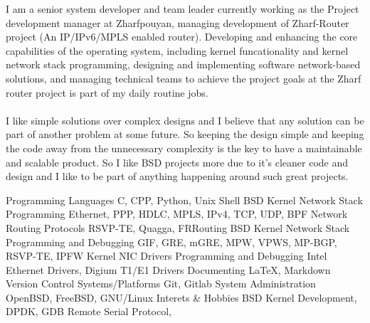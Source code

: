 \documentclass[12pt]{developercv}
\begin{document}
\begin{minipage}[t]{1\textwidth}
I am a senior system developer and team leader currently working
as the Project development manager at Zharfpouyan, managing development
of Zharf-Router project (An IP/IPv6/MPLS enabled router).
Developing and enhancing the core capabilities of the operating system,
including kernel funcationality and kernel network stack programming,
designing and implementing software network-based solutions, and managing
technical teams to achieve the project goals at the Zharf router project is
part of my daily routine jobs.
\\
\\
I like simple solutions over complex designs and I believe that any solution
can be part of another problem at some future. So keeping the design simple and
keeping the code away from the unnecessary complexity is the key to have a
maintainable and scalable product. So I like BSD projects more due to it's cleaner
code and design and I like to be part of anything happening around such great projects.

\end{minipage}
\hfill %
%

\begin{entrylist}
	\entry
		{}
		{Programming Languages}
		{}
		{C, CPP, Python, Unix Shell}
	\entry
		{}
		{BSD Kernel Network Stack Programming}
		{}
		{Ethernet, PPP, HDLC, MPLS, IPv4, TCP, UDP, BPF}
	\entry
		{}
		{Network Routing Protocols}
		{}
		{RSVP-TE, Quagga, FRRouting}
	\entry
		{}
		{BSD Kernel Network Stack Programming and Debugging}
		{}
		{GIF, GRE, mGRE, MPW, VPWS, MP-BGP, RSVP-TE, IPFW}
	\entry
		{}
		{Kernel NIC Drivers Programming and Debugging}
		{}
		{Intel Ethernet Drivers, Digium T1/E1 Drivers} %
	\entry
		{}
		{Documenting}
		{}
		{\LaTeX, Markdown}
	\entry
		{}
		{Version Control Systems/Platforms}
		{}
		{Git, Gitlab}
	\entry
		{}
		{System Administration}
		{}
		{OpenBSD, FreeBSD, GNU/Linux}
	\entry
		{}
		{Interets \& Hobbies}
		{}
		{BSD Kernel Development, DPDK, GDB Remote Serial Protocol, }
\end{entrylist}
\end{document}

